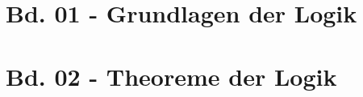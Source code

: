 \documentclass{book}
\newcounter{file}
\theoremstyle{remark}
\begin{document}
\title{}
\author{}
\date{}


\setcounter{file}{1}
\part{Bd. 01 - Grundlagen der Logik}


\setcounter{file}{2}
\part{Bd. 02 - Theoreme der Logik}



\setcounter{file}{3}
%
\end{document}
